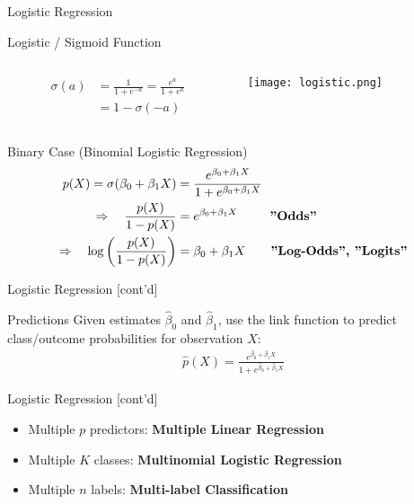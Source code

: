 \documentclass[ignorenonframetext,xcolor=x11names]{beamer}
\begin{document}
\begin{frame}{Logistic Regression}
\begin{block}{Logistic / Sigmoid Function}
\begin{columns}
\begin{column}{0.6\textwidth}
\begin{align*}
  \sigma(a) &= \frac{1}{1 + e^{-a}} = \frac{e^a}{1 + e^a} \\
  &= 1 - \sigma(-a)
\end{align*}
\end{column}
\begin{column}{0.4\textwidth}
\texttt{[image: logistic.png]}
\end{column}
\end{columns}
\end{block}

\begin{block}{Binary Case (Binomial Logistic Regression)}
\small
\begin{align*}
p(X) = \sigma( \beta_0 + \beta_1 X) &= \frac{e^{\beta_0 + \beta_1 X}}{1 + e^{\beta_0 + \beta_1 X}} \\
\Rightarrow \quad \frac{p(X)}{1 - p(X)} &= e^{\beta_0 + \beta_1 X} \qquad\;\; \text{\textbf{''Odds''}} \\
\Rightarrow \quad \log \left( \frac{p(X)}{1 - p(X)} \right) &= \beta_0 + \beta_1 X \qquad \text{\textbf{''Log-Odds'', ''Logits''}}
\end{align*}
\end{block}
\end{frame}

\begin{frame}{Logistic Regression \small [cont'd]}
\begin{block}{Predictions}
Given estimates $\hat{\beta}_0$ and $\hat{\beta}_1$, use the link function to predict class/outcome probabilities for observation $X$:
\begin{align*}
  \hat{p}(X) = \frac{e^{\hat{\beta}_0 + \hat{\beta}_1 X}}{1 + e^{\hat{\beta}_0 + \hat{\beta}_1 X}}
\end{align*}
\end{block}
\end{frame}

\begin{frame}{Logistic Regression \small [cont'd]}
\begin{itemize}
   \item Multiple $p$ predictors: \textbf{Multiple Linear Regression}
   \item Multiple $K$ classes: \textbf{Multinomial Logistic Regression}
   \item Multiple $n$ labels: \textbf{Multi-label Classification}
\end{itemize}
\end{frame}
\end{document}
